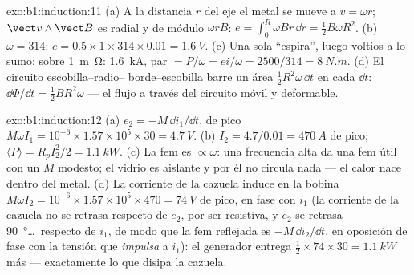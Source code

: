 \begin{solution}{exo:b1:induction:11}
(a) A la distancia $r$ del eje el metal se mueve a $v = \omega r$; $\vect v\wedge\vect B$ es
radial y de módulo $\omega rB$: $e = \int_0^R\omega Br\,\dd r = \tfrac12B\omega R^2$.
(b) $\omega = 314$: $e = 0.5 \times 1 \times 314 \times 0.01 = \qty{1.6}{V}$. (c) Una
sola ``espira'', luego voltios a lo sumo; sobre \qty{1}{m\ohm}: \qty{1.6}{kA}, par
$= P/\omega = ei/\omega = 2500/314 = \qty{8}{N.m}$. (d) El circuito escobilla--radio--
borde--escobilla barre un área $\tfrac12R^2\omega\,\dd t$ en cada $\dd t$: $\dd\Phi/\dd t =
\tfrac12BR^2\omega$ --- el flujo a través del circuito móvil y deformable.
\end{solution}

\begin{solution}{exo:b1:induction:12}
(a) $e_2 = -M\,\dd i_1/\dd t$, de pico $M\omega I_1 = 10^{-6} \times 1.57 \times 10^5 \times 30 =
\qty{4.7}{V}$. (b) $I_2 = 4.7/0.01 = \qty{470}{A}$ de pico; $\langle P\rangle = R_pI_2^2/2
= \qty{1.1}{kW}$. (c) La fem es $\propto\omega$: una frecuencia alta da una fem
útil con un $M$ modesto; el vidrio es aislante y por él no circula nada
--- el calor nace dentro del metal. (d) La corriente de la cazuela induce en
la bobina $M\omega I_2 = 10^{-6} \times 1.57 \times 10^5 \times 470 = \qty{74}{V}$ de pico,
en fase con $i_1$ (la corriente de la cazuela no se retrasa respecto de
$e_2$, por ser resistiva, y $e_2$ se retrasa \qty{90}{\degree}\ldots\ respecto de $i_1$, de modo que la
fem reflejada es $-M\,\dd i_2/\dd t$, en oposición de fase con la tensión
que \emph{impulsa} a $i_1$): el generador entrega $\tfrac12 \times 74 \times 30 =
\qty{1.1}{kW}$ más --- exactamente lo que disipa la cazuela.
\end{solution}


